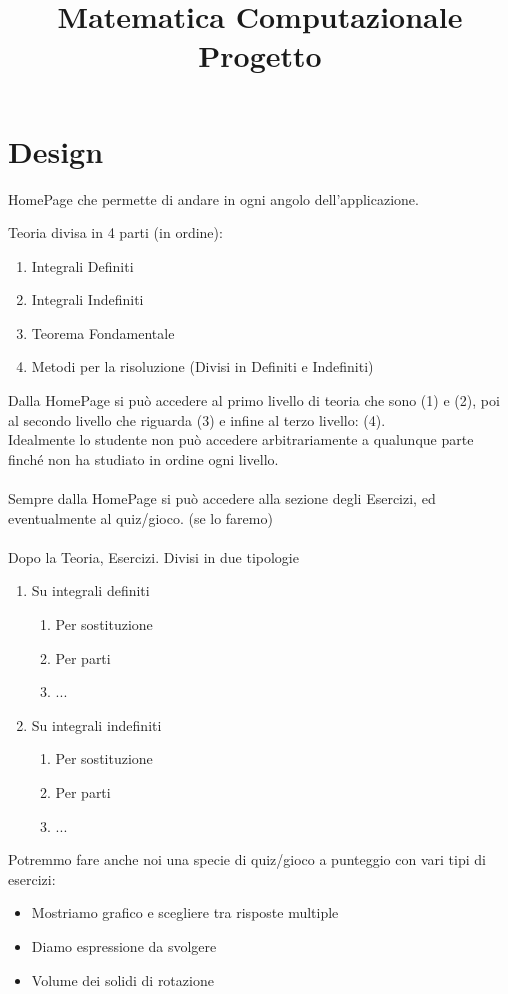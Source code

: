 \documentclass{article}
\title{Matematica Computazionale Progetto}
\date{}
\begin{document}
	
	\maketitle

	\section*{Design}
	
	HomePage che permette di andare in ogni angolo dell'applicazione.
		
	Teoria divisa in 4 parti (in ordine):
	
	\begin{enumerate}
		\item Integrali Definiti
		\item Integrali Indefiniti
		\item Teorema Fondamentale
		\item Metodi per la risoluzione (Divisi in Definiti e Indefiniti)
	\end{enumerate}
	Dalla HomePage si può accedere al primo livello di teoria che sono (1) e (2), poi al secondo livello che riguarda (3) e infine al terzo livello: (4).\\
	
	Idealmente lo studente non può accedere arbitrariamente a qualunque parte finché non ha studiato in ordine ogni livello.\\
	\\
	Sempre dalla HomePage si può accedere alla sezione degli Esercizi, ed eventualmente al quiz/gioco. (se lo faremo)\\
	\\
	Dopo la Teoria, Esercizi. Divisi in due tipologie 
	
	\begin{enumerate}
		\item Su integrali definiti
		\begin{enumerate}
			\item Per sostituzione
			\item Per parti
			\item ...
		\end{enumerate}
		\item Su integrali indefiniti
		\begin{enumerate}
			\item Per sostituzione
			\item Per parti
			\item ...
		\end{enumerate}
	\end{enumerate}
	Potremmo fare anche noi una specie di quiz/gioco a punteggio con vari tipi di esercizi:
	\begin{itemize}
		\item Mostriamo grafico e scegliere tra risposte multiple
		\item Diamo espressione da svolgere
		\item Volume dei solidi di rotazione
	\end{itemize}
\end{document}
